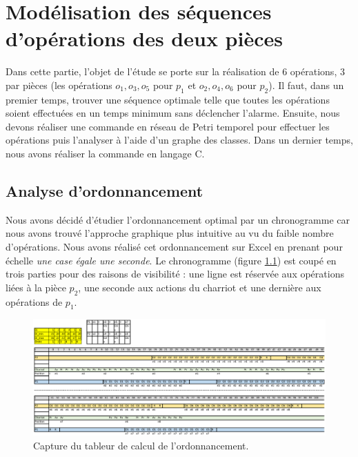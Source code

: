 \chapter{Modélisation des séquences d'opérations des deux pièces}
Dans cette partie, l'objet de l'étude se porte sur la réalisation de 6 opérations, 3 par pièces (les opérations $o_1 , o_3 , o_5$ pour $p_1$ et $o_2 , o_4 , o_6 $ pour $p_2$). Il faut, dans un premier temps, trouver une séquence optimale telle que toutes les opérations soient effectuées en un temps minimum sans déclencher l'alarme. Ensuite, nous devons réaliser une commande en réseau de Petri temporel pour effectuer les opérations puis l'analyser à l'aide d'un graphe des classes. Dans un dernier temps, nous avons réaliser la commande en langage C. 
\section{Analyse d'ordonnancement}
Nous avons décidé d'étudier l'ordonnancement optimal par un chronogramme car nous avons trouvé l'approche graphique plus intuitive au vu du faible nombre d'opérations. Nous avons réalisé cet ordonnancement sur Excel en prenant pour échelle \emph{une case égale une seconde}. Le chronogramme (figure \ref{fig:ordoExcel}) est coupé en trois parties pour des raisons de visibilité : une ligne est réservée aux opérations liées à la pièce $p_2$, une seconde aux actions du charriot et une dernière aux opérations de $p_1$.

\begin{figure}[!ht]
\centering
\includegraphics[width=\textwidth]{./III/images/ordo.pdf}
\caption{\label{fig:ordoExcel}Capture du tableur de calcul de l'ordonnancement.}
\end{figure}


